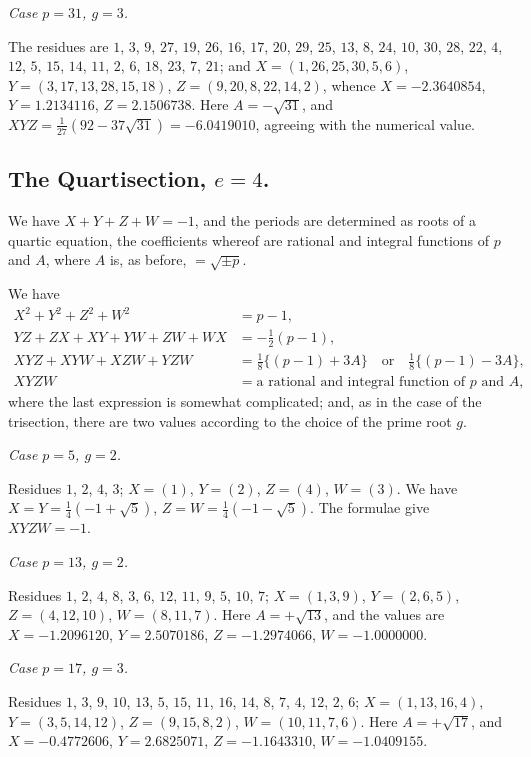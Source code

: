 \documentclass[11pt,a4paper]{book}
\begin{document}
\textit{Case $p=31$, $g=3$.}

The residues are $1$, $3$, $9$, $27$, $19$, $26$, $16$, $17$, $20$, $29$,
$25$, $13$, $8$, $24$, $10$, $30$, $28$, $22$, $4$, $12$, $5$, $15$, $14$, $11$,
$2$, $6$, $18$, $23$, $7$, $21$; and $X=(1,26,25,30,5,6)$,
$Y=(3,17,13,28,15,18)$, $Z=(9,20,8,22,14,2)$, whence
$X=-2.3640854$, $Y=1.2134116$, $Z=2.1506738$. Here $A=-\sqrt{31}$,
and $XYZ=\frac{1}{27}(92-37\sqrt{31})=-6.0419010$, agreeing with the numerical
value.

\newpage
\subsection*{The Quartisection, $e=4$.}

We have $X+Y+Z+W=-1$, and the periods are determined as
roots of a quartic equation, the coefficients whereof are rational and
integral functions of $p$ and $A$, where $A$ is, as before, $=\sqrt{\pm p}$.

We have
\begin{align*}
X^2+Y^2+Z^2+W^2 &= p-1,\\
YZ+ZX+XY+YW+ZW+WX &= -\tfrac{1}{2}(p-1),\\
XYZ+XYW+XZW+YZW &= \tfrac{1}{8}\{(p-1)+3A\} \quad\text{or}\quad
\tfrac{1}{8}\{(p-1)-3A\},\\
XYZW &= \text{a rational and integral function of $p$ and $A$},
\end{align*}
where the last expression is somewhat complicated; and, as in the case
of the trisection, there are two values according to the choice of the
prime root $g$.

\textit{Case $p=5$, $g=2$.}

Residues $1$, $2$, $4$, $3$; $X=(1)$, $Y=(2)$, $Z=(4)$, $W=(3)$.
We have $X=Y=\frac{1}{4}(-1+\sqrt{5})$, $Z=W=\frac{1}{4}(-1-\sqrt{5})$.
The formulae give $XYZW=-1$.

\textit{Case $p=13$, $g=2$.}

Residues $1$, $2$, $4$, $8$, $3$, $6$, $12$, $11$, $9$, $5$, $10$, $7$;
$X=(1,3,9)$, $Y=(2,6,5)$, $Z=(4,12,10)$, $W=(8,11,7)$.
Here $A=+\sqrt{13}$, and the values are $X=-1.2096120$,
$Y=2.5070186$, $Z=-1.2974066$, $W=-1.0000000$.

\textit{Case $p=17$, $g=3$.}

Residues $1$, $3$, $9$, $10$, $13$, $5$, $15$, $11$, $16$, $14$, $8$,
$7$, $4$, $12$, $2$, $6$; $X=(1,13,16,4)$, $Y=(3,5,14,12)$,
$Z=(9,15,8,2)$, $W=(10,11,7,6)$. Here $A=+\sqrt{17}$, and
$X=-0.4772606$, $Y=2.6825071$, $Z=-1.1643310$, $W=-1.0409155$.
\end{document}
